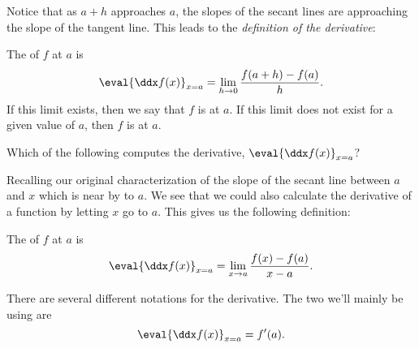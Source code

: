 \documentclass{ximera}
\begin{document}
Notice that as $a+h$ approaches $a$, the slopes of the secant lines are approaching
the slope of the tangent line.  This leads to the \textit{definition of the derivative}:

\begin{definition}
  The  of $f$ at $a$ is 
  \[
  \eval{\ddx f(x)}_{x=a} = \lim_{h\to 0} \frac{f(a+h) - f(a)}{h}.
  \]
  If this limit exists, then we say that $f$ is 
  at $a$.  If this limit does not exist for a given value of $a$, then
  $f$ is  at $a$.
\end{definition}



\begin{question} 
    Which of the following computes the derivative, $\eval{\ddx f(x)}_{x=a}$?
    \begin{selectAll}
    \end{selectAll}
\end{question}

Recalling our original characterization of the slope of the secant line
between $a$ and $x$ which is near by to $a$.  We see that we could also
calculate the derivative of a function by letting $x$ go to $a$.  This 
gives us the following definition:

\begin{definition}
	The  of $f$ at $a$ is
	\[
	\eval{\ddx f(x)}_{x=a} = \lim_{x\to a} \frac{f(x) - f(a)}{x-a}.
	\]
\end{definition}


\begin{definition}
  There are several different notations for the derivative.  The two we'll mainly be using are
  \[
  \eval{\ddx f(x)}_{x=a} = f'(a).
  \]
\end{definition}
\end{document}
